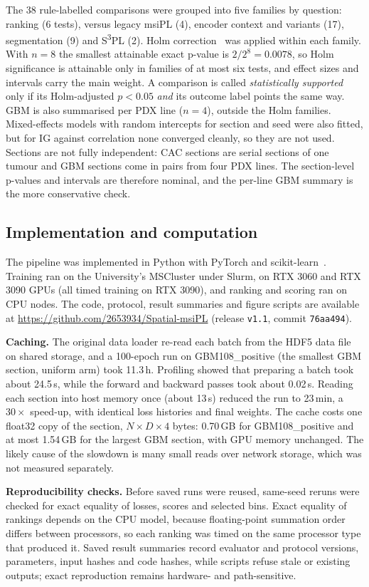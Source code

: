 The 38 rule-labelled comparisons were grouped into five families by question:
ranking (6 tests), versus legacy msiPL (4), encoder context and variants (17),
segmentation (9) and S\textsuperscript{3}PL (2). Holm
correction~\citep{holm1979simple} was applied within each family. With $n=8$
the smallest attainable exact p-value is $2/2^8=0.0078$, so Holm significance
is attainable only in families of at most six tests, and effect sizes and
intervals carry the main weight. A comparison is called \emph{statistically
supported} only if its Holm-adjusted $p<0.05$ \emph{and} its outcome label
points the same way. GBM is also summarised per PDX line ($n=4$), outside the
Holm families. Mixed-effects models with random intercepts for section and
seed were also fitted, but for IG against correlation none converged
cleanly, so they are not used. Sections are not fully independent: CAC
sections are serial sections of one tumour and GBM sections come in pairs from
four PDX lines. The section-level p-values and intervals are therefore
nominal, and the per-line GBM summary is the more conservative check.

\subsection{Implementation and computation}
\label{sec:compute}
The pipeline was implemented in Python with PyTorch and
scikit-learn~\citep{pedregosa2011scikit}. Training ran on the University's
MSCluster under Slurm, on RTX 3060 and RTX 3090 GPUs (all timed training on RTX
3090), and ranking and scoring
ran on CPU nodes. The code, protocol, result summaries and figure scripts are
available at \url{https://github.com/2653934/Spatial-msiPL} (release
\texttt{v1.1}, commit \texttt{76aa494}).

\textbf{Caching.} The original data loader re-read each batch from the HDF5 data file on
shared storage, and a 100-epoch run on GBM108\_positive (the smallest GBM
section, uniform arm) took 11.3\,h. Profiling showed that
preparing a batch took about 24.5\,s, while the forward and backward passes took
about 0.02\,s. Reading each section into host memory once (about 13\,s)
reduced the run to 23\,min, a $30\times$ speed-up, with identical loss
histories and final weights. The cache costs one float32 copy of the section,
$N\times D\times4$ bytes: 0.70\,GB for GBM108\_positive and at most 1.54\,GB for
the largest GBM section, with GPU memory unchanged. The likely cause of the
slowdown is many small reads over network storage, which was not measured
separately.

\textbf{Reproducibility checks.} Before saved runs were reused, same-seed reruns
were checked for exact equality of losses, scores and selected bins. Exact
equality of rankings depends on the CPU model, because floating-point
summation order differs between processors, so each ranking was timed on the
same processor type that produced it. Saved result summaries record evaluator
and protocol versions, parameters, input hashes and code hashes, while scripts
refuse stale or existing outputs; exact reproduction remains hardware- and
path-sensitive.
